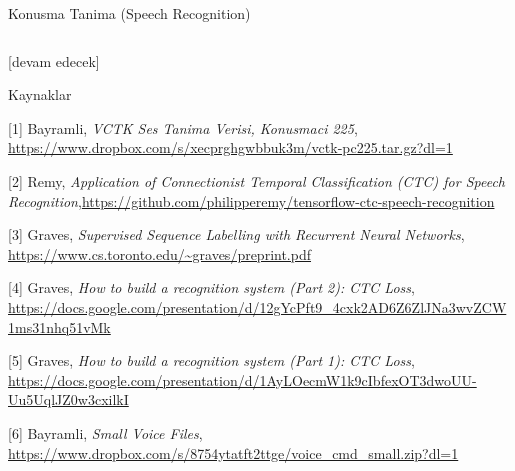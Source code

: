 \documentclass[12pt,fleqn]{article}\usepackage{../../common}
\begin{document}
Konusma Tanima (Speech Recognition)

\inputminted[fontsize=\footnotesize]{python}{train_vctk.py}

[devam edecek]

Kaynaklar

[1] Bayramli, {\em VCTK Ses Tanima Verisi, Konusmaci 225}, \url{https://www.dropbox.com/s/xecprghgwbbuk3m/vctk-pc225.tar.gz?dl=1}

[2] Remy, {\em Application of Connectionist Temporal Classification (CTC) for Speech Recognition},\url{https://github.com/philipperemy/tensorflow-ctc-speech-recognition}

[3] Graves, {\em Supervised Sequence Labelling with Recurrent Neural Networks}, \url{https://www.cs.toronto.edu/~graves/preprint.pdf}

[4] Graves, {\em How to build a recognition system (Part 2): CTC Loss}, \url{https://docs.google.com/presentation/d/12gYcPft9_4cxk2AD6Z6ZlJNa3wvZCW1ms31nhq51vMk}

[5] Graves, {\em How to build a recognition system (Part 1): CTC Loss}, \url{https://docs.google.com/presentation/d/1AyLOecmW1k9cIbfexOT3dwoUU-Uu5UqlJZ0w3cxilkI}

[6] Bayramli, {\em Small Voice Files}, \url{https://www.dropbox.com/s/8754ytatft2ttge/voice_cmd_small.zip?dl=1}
\end{document}
